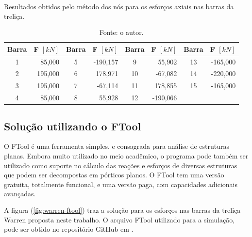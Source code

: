 \documentclass[a4paper, 12pt]{article} %
\def\comprimido{OrangeRed!30}
\def\tracionado{OliveGreen!30}
\begin{document}
\begin{table}[!ht]
    \centering
    \caption{Resultados obtidos pelo método dos nós para os esforços axiais nas barras da treliça.}
    \begin{tabular}{cr cr cr cr}
        \hline\hline
        Barra & F $[\unit{kN}]$ & Barra & F $[\unit{kN}]$ & Barra & F $[\unit{kN}]$ & Barra & F $[\unit{kN}]$\\
        \hline\hline
        1 & \colorbox{\tracionado}{85,000}  & 5 & \colorbox{\comprimido}{-190,157}  & 9  &  \colorbox{\tracionado}{55,902} & 13 & \colorbox{\comprimido}{-165,000} \\
        \hline
        2 & \colorbox{\tracionado}{195,000} & 6 &  \colorbox{\tracionado}{178,971}  & 10 & \colorbox{\comprimido}{-67,082} & 14 & \colorbox{\comprimido}{-220,000} \\
        \hline
        3 & \colorbox{\tracionado}{195,000} & 7 &  \colorbox{\comprimido}{-67,114}  & 11 & \colorbox{\tracionado}{178,855} & 15 & \colorbox{\comprimido}{-165,000} \\
        \hline
        4 & \colorbox{\tracionado}{85,000}  & 8 &  \colorbox{\tracionado}{55,928}   & 12 &\colorbox{\comprimido}{-190,066} &   &   \\
        \hline\hline
    \end{tabular}
    \vspace{3mm}
    \caption*{Fonte: o autor.}
    \label{tab:esforços_nós}
\end{table}

\subsection{Solução utilizando o FTool}

O FTool é uma ferramenta simples, e consagrada para análise de estruturas planas. Embora muito utilizado no meio acadêmico, o programa pode também ser utilizado como suporte no cálculo das reações e esforços de diversas estruturas que podem ser decompostas em pórticos planos. O FTool tem uma versão gratuita, totalmente funcional, e uma versão paga, com capacidades adicionais avançadas. 

A figura (\ref{fig:warren-ftool}) traz a solução para os esforços nas barras da treliça Warren proposta neste trabalho. O arquivo FTool utilizado para a simulação, pode ser obtido no repositório GitHub em \cite{maumenegaz}.
\end{document}
